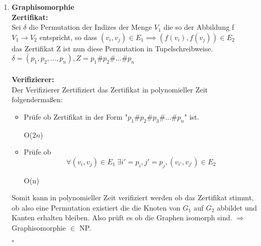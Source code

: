 \documentclass{article}
\begin{document}
\begin{enumerate}[label=(\alph*).]
		\item \textbf{Graphisomorphie}\\
		\textbf{Zertifikat:}\\
		Sei $\delta$ die Permutation der Indizes der Menge $V_1$ die so der Abbildung f $V_1 \rightarrow V_2$ entspricht, so dass $(v_i,v_j) \in E_1 \implies (f(v_i),f(v_j)) \in E_2$\\
		das Zertifikat Z ist nun diese Permutation in Tupelschreibweise. \\
		$\delta = (p_1,p_2,...,p_n), Z = p_1\#p_2\#...\#p_n$\\\\
		\textbf{Verifizierer:}\\
		Der Verifizierer Zertifiziert das Zertifikat in polynomieller Zeit folgendermaßen:
		\begin{itemize}
			\item Prüfe ob Zertifikat in der Form "$p_1\#p_2\#p_3\#...\#p_n$" ist. \begin{flushright}O($2n$)\end{flushright}
			\item Prüfe ob $$
			\forall (v_i,v_j) \in E_1\ \exists i' = p_i, j' = p_j, (v_{i'},v_{j'}) \in E_2
			$$
			\begin{flushright}O(n)\end{flushright}
		\end{itemize}
		Somit kann in polynomieller Zeit verifiziert werden ob das Zertifikat stimmt, ob also eine Permutation existiert die die Knoten von $G_1$ auf $G_2$ abbildet und Kanten erhalten bleiben. Also prüft es ob die Graphen isomorph sind. $\Rightarrow$ Graphisomorphie $\in$ NP.
		\begin{flushright}$\square$\end{flushright}
	\end{enumerate}
	
\end{document}
